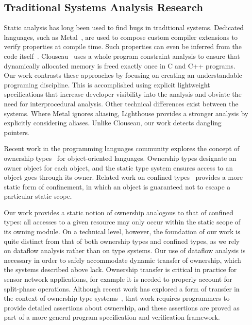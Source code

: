 \subsection{Traditional Systems Analysis Research}



Static analysis has long been used to find bugs in traditional systems.
%
Dedicated languages, such as Metal~\cite{engler00checking}, are used to
compose custom compiler extensions to verify properties at compile time.
%
Such properties can even be inferred from the code
itself~\cite{kremenek06from}.
%
Clouseau~\cite{heine03practical} uses a whole program constraint analysis to
ensure that dynamically allocated memory is freed exactly once in C and C++
programs.
%
Our work contrasts these approaches by focusing on creating an
understandable programing discipline.
%
This is accomplished using explicit lightweight specifications that increase
developer visibility into the analysis and obviate the need for
interprocedural analysis.
%
Other technical differences exist between the systems.
%
Where Metal ignores aliasing, Lighthouse provides a stronger analysis by
explicitly considering aliases.
%
Unlike Clouseau, our work detects dangling pointers.




Recent work in the programming languages community explores the concept of
ownership types~\cite{ownership,ownership2,BoyapatiEtAl02,aliasjava} for
object-oriented languages. 
%
Ownership types designate an owner object for each object, and the static
type system ensures access to an object goes through its owner.
%
Related work on confined types~\cite{confined1,confined2} provides a more
static form of confinement, in which an object is guaranteed not to escape a
particular static scope.



Our work provides a static notion of ownership analogous to that of confined
types:  all accesses to a given resource may only occur within the static
scope of its owning module.  
%
On a technical level, however, the foundation of our work is quite distinct
from that of both ownership types and confined types, as we rely on dataflow
analysis rather than on type systems.  
%
Our use of dataflow analysis is necessary in order to safely accommodate
dynamic transfer of ownership, which the systems described above lack.  
%
Ownership transfer is critical in practice for sensor network applications,
for example it is needed to properly account for split-phase operations.  
%
Although recent work has explored a form of transfer in the context of
ownership type systems~\cite{DBLP:conf/ecoop/BanerjeeN05}, that work
requires programmers to provide detailed assertions about ownership, and
these assertions are proved as part of a more general program specification
and verification framework.




